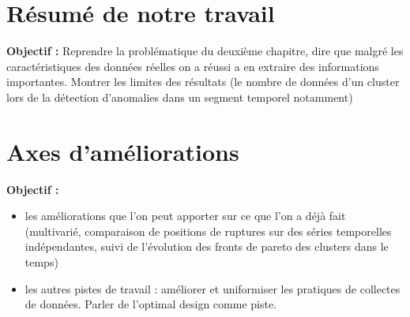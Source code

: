 \documentclass[12pt, twoside]{report}
\begin{document}
\section{Résumé de notre travail}

\textbf{Objectif :} Reprendre la problématique du deuxième chapitre, dire que malgré les caractéristiques des données réelles on a réussi a en extraire des informations importantes. Montrer les limites des résultats (le nombre de données d'un cluster lors de la détection d'anomalies dans un segment temporel notamment)

\section{Axes d'améliorations}

\textbf{Objectif :}
\begin{itemize}
\item les améliorations que l'on peut apporter sur ce que l'on a déjà fait (multivarié, comparaison de positions de ruptures sur des séries temporelles indépendantes, suivi de l'évolution des fronts de pareto des clusters dans le temps)
\item les autres pistes de travail : améliorer et uniformiser les pratiques de collectes de données. Parler de l'optimal design comme piste. 
\end{itemize}
\end{document}
